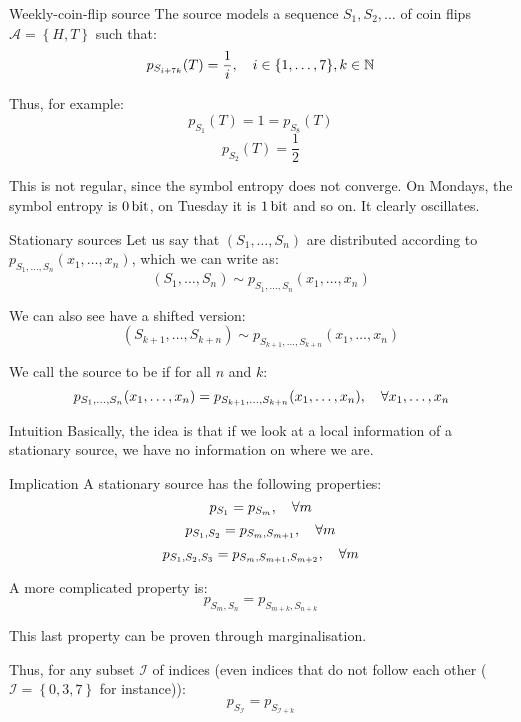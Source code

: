 \documentclass[a4paper]{article}
\begin{document}
\begin{parag}{Weekly-coin-flip source}
    The source models a sequence $S_1, S_2, \ldots$ of coin flips $\mathcal{A} = \left\{H, T\right\}$ such that: 
    \[p_{S_{i + 7k}}\left(T\right) = \frac{1}{i}, \mathspace i \in \left\{1, \ldots, 7\right\}, k \in \mathbb{N}\]
    
    Thus, for example: 
    \[p_{S_1}\left(T\right) = 1 = p_{S_8}\left(T\right)\]
    \[p_{S_2}\left(T\right) = \frac{1}{2}\]

    This is not regular, since the symbol entropy does not converge. On Mondays, the symbol entropy is $\SI{0}{\bit}$, on Tuesday it is $\SI{1}{\bit}$ and so on. It clearly oscillates.
\end{parag}

\begin{parag}{Stationary sources}
    Let us say that $\left(S_1, \ldots, S_n\right)$ are distributed according to $p_{S_1, \ldots, S_n}\left(x_1, \ldots, x_n\right)$, which we can write as: 
    \[\left(S_1, \ldots, S_n\right) \sim p_{S_1, \ldots, S_n}\left(x_1, \ldots, x_n\right)\]
    
    We can also see have a shifted version: 
    \[\left(S_{k+1}, \ldots, S_{k+n}\right) \sim p_{S_{k+1}, \ldots, S_{k+n}}\left(x_1, \ldots, x_n\right)\]
    
    We call the source to be  if for all $n$ and $k$: 
    \[p_{S_1, \ldots, S_n}\left(x_1, \ldots, x_n\right) = p_{S_{k+1}, \ldots, S_{k+n}}\left(x_1, \ldots, x_n\right), \mathspace \forall x_1, \ldots, x_n\]
    
    \begin{subparag}{Intuition}
        Basically, the idea is that if we look at a local information of a stationary source, we have no information on where we are.
    \end{subparag}
    
    \begin{subparag}{Implication}
        A stationary source has the following properties: 
        \[p_{S_1} = p_{S_m}, \quad \forall m\]
        \[p_{S_1, S_2} = p_{S_m, S_{m+1}}, \quad \forall m\]
        \[p_{S_1, S_2, S_3} = p_{S_m, S_{m+1}, S_{m+2}}, \quad \forall m\]

        A more complicated property is:
        \[p_{S_m, S_n} = p_{S_{m+k}, S_{n+k}}\]

        This last property can be proven through marginalisation.

        Thus, for any subset $\mathcal{I}$ of indices (even indices that do not follow each other ($\mathcal{I} = \left\{0, 3, 7\right\}$ for instance)): 
        \[p_{S_\mathcal{I}} = p_{S_{\mathcal{I} + k}}\]
        
    \end{subparag}
\end{parag}
\end{document}
